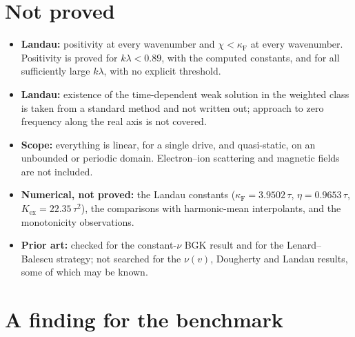 \documentclass[11pt]{article}
\begin{document}
\section{Not proved}

\begin{itemize}
  \item \textbf{Landau:} positivity at every wavenumber and
    $\chi<\kappa_{\mathrm F}$ at every wavenumber. Positivity is proved for
    $k\lambda<0.89$, with the computed constants, and for all sufficiently
    large $k\lambda$, with no explicit threshold.
  \item \textbf{Landau:} existence of the time-dependent weak solution in
    the weighted class is taken from a standard method and not written out;
    approach to zero frequency along the real axis is not covered.
  \item \textbf{Scope:} everything is linear, for a single drive, and
    quasi-static, on an unbounded or periodic domain. Electron--ion
    scattering and magnetic fields are not included.
  \item \textbf{Numerical, not proved:} the Landau constants
    ($\kappa_{\mathrm F}=3.9502\,\tau$, $\eta=0.9653\,\tau$,
    $K_{\mathrm{ex}}=22.35\,\tau^2$), the comparisons with harmonic-mean
    interpolants, and the monotonicity observations.
  \item \textbf{Prior art:} checked for the constant-$\nu$ BGK result and
    for the Lenard--Balescu strategy; not searched for the $\nu(v)$,
    Dougherty and Landau results, some of which may be known.
\end{itemize}

\section{A finding for the benchmark}
\end{document}

